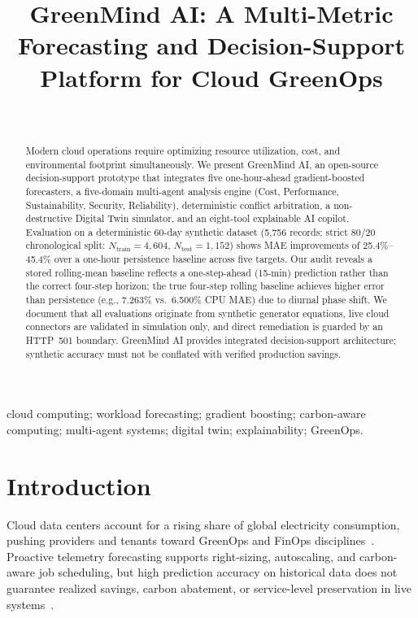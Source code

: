 \documentclass[conference]{IEEEtran}
\title{GreenMind AI: A Multi-Metric Forecasting and Decision-Support\\
Platform for Cloud GreenOps}
\author{%
  \IEEEauthorblockN{Anonymous Submission Draft}\\
  \IEEEauthorblockA{%
    \textit{[Author affiliations to be inserted for camera-ready submission]}\\
    \texttt{[contact@institution.edu]}
  }
}
\begin{document}
\maketitle

\begin{abstract}
Modern cloud operations require optimizing resource utilization, cost, and
environmental footprint simultaneously. We present GreenMind AI, an
open-source decision-support prototype that integrates five one-hour-ahead
gradient-boosted forecasters, a five-domain multi-agent analysis engine
(Cost, Performance, Sustainability, Security, Reliability), deterministic
conflict arbitration, a non-destructive Digital Twin simulator, and an
eight-tool explainable AI copilot. Evaluation on a deterministic 60-day
synthetic dataset (5,756 records; strict 80/20 chronological split:
$N_{\text{train}}=4{,}604$, $N_{\text{test}}=1{,}152$) shows MAE
improvements of 25.4\%--45.4\% over a one-hour persistence baseline across
five targets. Our audit reveals a stored rolling-mean baseline reflects a
one-step-ahead (15-min) prediction rather than the correct four-step horizon;
the true four-step rolling baseline achieves higher error than persistence
(e.g., 7.263\% vs.\ 6.500\% CPU MAE) due to diurnal phase shift. We
document that all evaluations originate from synthetic generator equations,
live cloud connectors are validated in simulation only, and direct
remediation is guarded by an HTTP~501 boundary. GreenMind AI provides
integrated decision-support architecture; synthetic accuracy must not be
conflated with verified production savings.
\end{abstract}

\begin{IEEEkeywords}
cloud computing; workload forecasting; gradient boosting; carbon-aware
computing; multi-agent systems; digital twin; explainability; GreenOps.
\end{IEEEkeywords}

\section{Introduction}
Cloud data centers account for a rising share of global electricity
consumption, pushing providers and tenants toward GreenOps and FinOps
disciplines~\cite{r4,r6}. Proactive telemetry forecasting supports
right-sizing, autoscaling, and carbon-aware job scheduling, but high
prediction accuracy on historical data does not guarantee realized savings,
carbon abatement, or service-level preservation in live
systems~\cite{r3,r8}.
\end{document}
